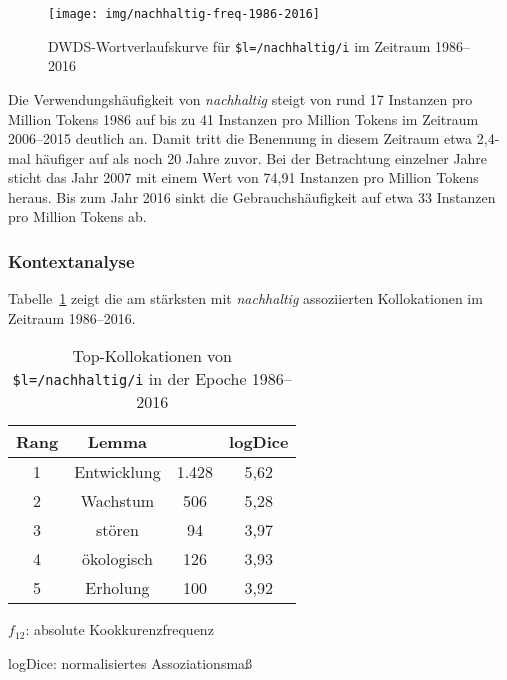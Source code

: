 \documentclass[
    german,
    a4paper,%
    12pt,%
    oneside,%
    toc=bibliography,
    final,
]{scrartcl}
\begin{document}
\begin{figure}[h!]
	\centering
	
	\texttt{[image: img/nachhaltig-freq-1986-2016]}
	\caption[corpus-size]{DWDS-Wortverlaufskurve für \lstinline|$l=/nachhaltig/i| im Zeitraum 1986–2016\protect\footnotemark}
	\label{fig:nachhaltig-freq-1986-2016}
\end{figure}

Die Verwendungshäufigkeit von \textit{nachhaltig} steigt von rund 17 Instanzen pro Million Tokens 1986 auf bis zu 41 Instanzen pro Million Tokens im Zeitraum 2006–2015 deutlich an. Damit tritt die Benennung in diesem Zeitraum etwa 2,4-mal häufiger auf als noch 20 Jahre zuvor. Bei der Betrachtung einzelner Jahre sticht das Jahr 2007 mit einem Wert von 74,91 Instanzen pro Million Tokens heraus. Bis zum Jahr 2016 sinkt die Gebrauchshäufigkeit auf etwa 33 Instanzen pro Million Tokens ab.

\subsubsection{Kontextanalyse}


Tabelle~\ref{tab:kollokationen-epoche4} zeigt die am stärksten mit \textit{nachhaltig} assoziierten Kollokationen im Zeitraum 1986–2016.

\begin{table}[h!]
	\centering
	\renewcommand{\arraystretch}{1.5}
	
	\caption{Top-Kollokationen von \lstinline|$l=/nachhaltig/i| in der Epoche 1986–2016\protect\footnotemark}
	\label{tab:kollokationen-epoche4}
	
	\begin{threeparttable}
	
	\begin{tabular}{cccc}
	\textbf{Rang} & \textbf{Lemma} & \boldmath{$f_{12}$} & \textbf{logDice} \\ \hline
	1 & Entwicklung & 1.428 & 5,62 \\ \hline
	2 & Wachstum & 506 & 5,28 \\ \hline
	3 & stören & 94 & 3,97 \\ \hline
	4 & ökologisch & 126 & 3,93 \\ \hline
	5 & Erholung & 100 & 3,92 \\ \hline
	\end{tabular} 
	
	\begin{tablenotes}
	\footnotesize
	\setlength{\itemindent}{-1.2em}
	\item $f_{12}$: absolute Kookkurenzfrequenz
	\item logDice: normalisiertes Assoziationsmaß
	\end{tablenotes}
	
	\end{threeparttable}
\end{table}
\end{document}
